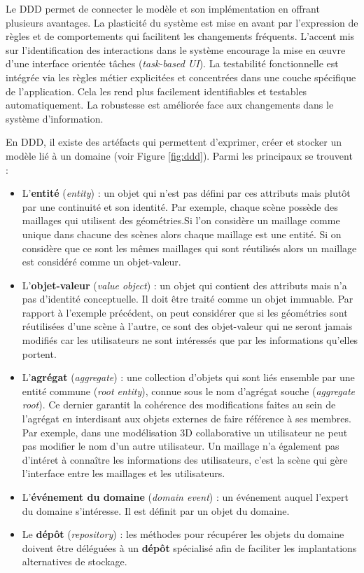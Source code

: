 Le \gls{DDD} permet de connecter le modèle et son implémentation en offrant 
plusieurs avantages. La plasticité du système est mise en avant par l'expression 
de règles et de comportements qui facilitent les changements fréquents.
L'accent mis sur l'identification des interactions dans le système encourage la 
mise en \oe{}uvre d'une interface orientée tâches (\textit{task-based UI}).
La testabilité fonctionnelle est intégrée via les règles métier explicitées 
et concentrées dans une couche spécifique de l'application. Cela les rend 
plus facilement identifiables et testables automatiquement.
La robustesse est améliorée face aux changements dans le système d'information.

En \gls{DDD}, il existe des artéfacts qui permettent d'exprimer, créer et stocker un 
modèle lié à un domaine (voir Figure \ref{fig:ddd}). Parmi les principaux se trouvent 
:
\begin{itemize}
	\item L'\textbf{entité} (\textit{entity}) : un objet qui n'est pas défini par ces 
	attributs 
	mais plutôt par une continuité et son identité. 
	Par exemple, chaque scène possède des maillages qui utilisent des 
	géométries.Si l'on 
	considère un maillage comme unique dans chacune des scènes alors chaque 
	maillage est une entité. Si on considère que ce sont les mêmes maillages qui 
	sont réutilisés alors un maillage est considéré comme un objet-valeur.
	
	\item L'\textbf{objet-valeur} (\textit{value object}) : un objet qui contient des 
	attributs 
	mais n'a pas d'identité conceptuelle. Il doit être traité comme un objet
	immuable. Par rapport à l'exemple précédent, on peut considérer que si les 
	géométries sont réutilisées d'une scène à l'autre, ce sont des objet-valeur qui 
	ne seront jamais modifiés car les utilisateurs ne sont intéressés que par les 
	informations qu'elles portent.
	
	\item L'\textbf{agrégat} (\textit{aggregate}) : une collection d'objets qui sont 
	liés 
	ensemble par une entité commune (\textit{root entity}), connue sous le nom 
	d'agrégat souche (\textit{aggregate root}). Ce dernier garantit la cohérence des 
	modifications faites au sein de l'agrégat en interdisant aux objets externes de 
	faire référence à ses membres. Par exemple, dans une modélisation 3D 
	collaborative un utilisateur ne peut pas modifier le nom d'un autre utilisateur. Un 
	maillage n'a également pas d'intéret à connaître les informations des 
	utilisateurs, c'est la scène qui gère l'interface entre les maillages et les 
	utilisateurs.
	\item L'\textbf{événement du domaine} (\textit{domain event}) : un 
	événement auquel 
	l'expert du domaine s'intéresse. Il est définit par un objet du domaine.
	\item Le \textbf{dépôt} (\textit{repository}) : les méthodes pour récupérer les 
	objets du domaine doivent être déléguées à un \textbf{dépôt} spécialisé afin de 
	faciliter les implantations 
	alternatives de stockage.
\end{itemize}



